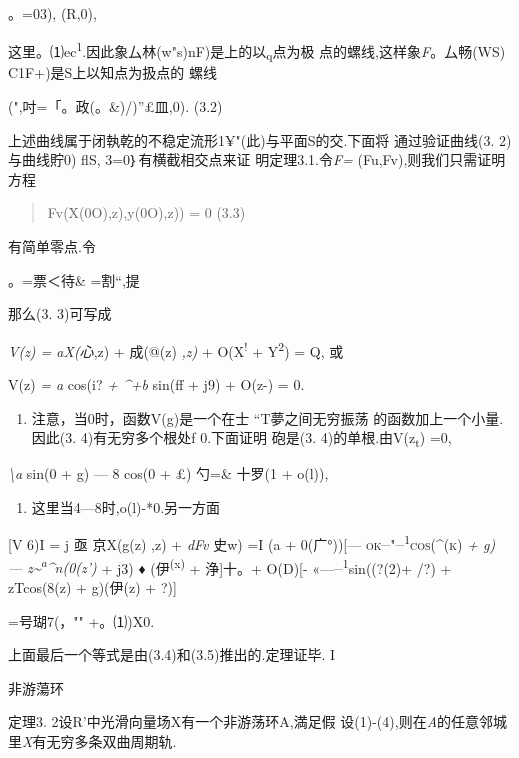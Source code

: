 \documentclass{article}
\begin{document}
。=03), (R,0),

这里。⑴ec\textsuperscript{1}.因此象厶林(w"s)nF)是上的以\textsubscript{q}点为极
点的螺线,这样象\emph{F}。厶畅(WS) C1F+)是S上以知点为扱点的 螺线

(",吋=「。政(。\&)/)''£皿,0). (3.2)

上述曲线属于闭執乾的不稳定流形1¥"(此)与平面S的交.下面将 通过验证曲线(3.
2)与曲线貯0) flS, 3=0｝有横截相交点来证 明定理3.1.令\emph{F=}
(Fu,Fv),则我们只需证明方程

\begin{quote}
Fv(X(0O),z),y(0O),z)) = 0 (3.3)
\end{quote}

有简单零点.令

。=票\textbar{}＜待\& =割``,提

那么(3. 3)可写成

\emph{V(z) = aX(心},z) + 成(@(z) \emph{,z)} + O(X\textsuperscript{!} +
Y\textsuperscript{2}) = Q, 或

V(z) \emph{= a} cos(i? \emph{+ \^{}+b} sin(ff + j9) + O(z-) = 0.

\begin{enumerate}
\def\labelenumi{\arabic{enumi}.}
\setcounter{enumi}{3}
\item
  注意，当0时，函数V(g)是一个在士 ``T夢之间无穷振荡
  的函数加上一个小量.因此(3. 4)有无穷多个根处f 0.下面证明 砲是(3.
  4)的单根.由V(z\textsubscript{t}) =0,
\end{enumerate}

\emph{\textbackslash{}a} sin(0 + g) --- 8 cos(0 + £) \textbar{} 勺=\&
十罗(1 + o(l)),

\begin{enumerate}
\def\labelenumi{\arabic{enumi}.}
\setcounter{enumi}{4}
\item
  这里当4---8时,o(l)-*0.另一方面
\end{enumerate}

{[}V 6)I = j 亟 {京X(g(z) ,z)} + \emph{dFv} {史w)} =I (a + 0(广°)){[}---
\textsc{ok\textsuperscript{\_}"\textsuperscript{\_1}cos(\^{}(k)} \emph{+
g) --- z\textasciitilde{}\textsuperscript{a}\^{}n(0(z')} + j3) ♦
(伊\textsuperscript{(x)} + 浄{]}十。+ O(D){[}-
«---\textsuperscript{\_1}sin((?(2)+ /?) + zTcos(8(z) + g)(伊(z) +
?){]}\textbar{}

=号瑚7(，"" +。⑴)X0.

上面最后一个等式是由(3.4)和(3.5)推出的.定理证毕. I

非游蕩环

定理3. 2设R'中光滑向量场X有一个非游荡环A,満足假
设(1)-(4),则在\emph{A}的任意邻城里\emph{X}有无穷多条双曲周期轨.
\end{document}
